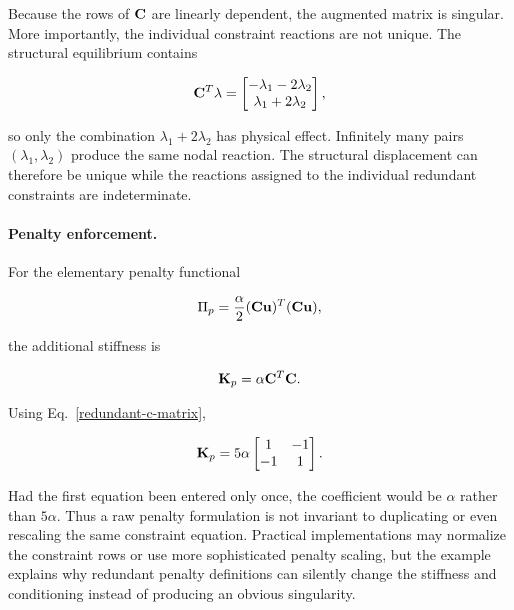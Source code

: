 Because the rows of $\mathbf{C}$ are linearly dependent, the augmented matrix is
singular. More importantly, the individual constraint reactions are not unique.
The structural equilibrium contains

\begin{equation}
    \mathbf{C}^{T}\mathbf{\lambda}
    =
    \begin{bmatrix}
        -\lambda_1-2\lambda_2\\
         \lambda_1+2\lambda_2
    \end{bmatrix},
\end{equation}

so only the combination $\lambda_1+2\lambda_2$ has physical effect. Infinitely
many pairs $(\lambda_1,\lambda_2)$ produce the same nodal reaction. The
structural displacement can therefore be unique while the reactions assigned to
the individual redundant constraints are indeterminate.

\paragraph{Penalty enforcement.}
For the elementary penalty functional

\begin{equation}
    \Pi_p
    =
    \frac{\alpha}{2}
    (\mathbf{C}\mathbf{u})^T(\mathbf{C}\mathbf{u}),
\end{equation}

the additional stiffness is

\begin{equation}
    \mathbf{K}_p=\alpha\mathbf{C}^{T}\mathbf{C}.
\end{equation}

Using Eq.~\eqref{redundant-c-matrix},

\begin{equation}
    \mathbf{K}_p
    =
    5\alpha
    \begin{bmatrix}
         1 & -1\\
        -1 &  1
    \end{bmatrix}.
\end{equation}

Had the first equation been entered only once, the coefficient would be
$\alpha$ rather than $5\alpha$. Thus a raw penalty formulation is not invariant
to duplicating or even rescaling the same constraint equation. Practical
implementations may normalize the constraint rows or use more sophisticated
penalty scaling, but the example explains why redundant penalty definitions can
silently change the stiffness and conditioning instead of producing an obvious
singularity.

